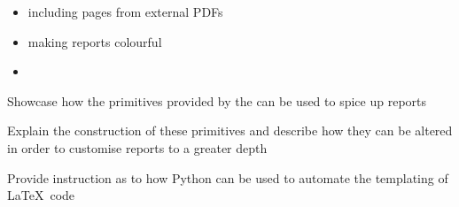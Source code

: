 \begin{methodology0}
\begin{itemize}
      \item including pages from external PDFs
      \item making reports colourful
      \item {}
    \end{itemize}
  \item Showcase how the primitives provided by the \uswdwmspkg{} can be used to spice up reports
  \item Explain the construction of these primitives and describe how they can be altered in order to customise reports to a greater depth
  \item Provide instruction as to how Python can be used to automate the templating of \LaTeX\ code
\end{methodology0}
